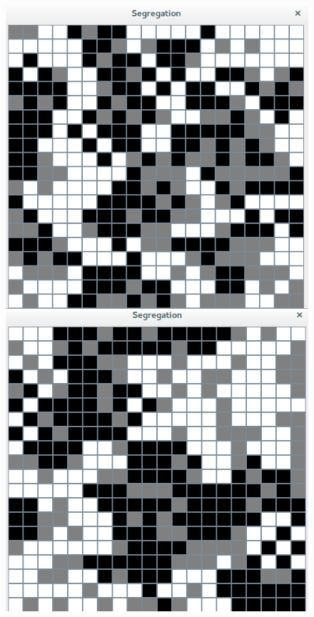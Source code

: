 \documentclass[a4paper,12pt]{report}
\begin{document}
\begin{figure}[!ht]
	\center 
	\includegraphics[scale=0.3]{150_150_30.png}
	\includegraphics[scale=0.3]{150_150_40.png}

\end{figure}
\end{document}
